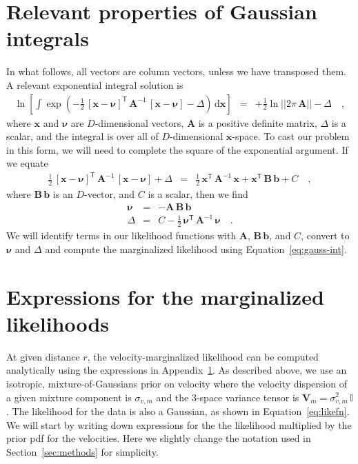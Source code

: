 \documentclass[manuscript, letterpaper]{aastex6}
\newcommand{\project}[1]{\textsl{#1}}
\newcommand{\acronym}[1]{{\small{#1}}}
\newcommand{\apogee}{\project{\acronym{APOGEE}}}
\newcommand{\sectionname}{Section}
\newcommand{\eqname}{Equation}
\newcommand{\dd}{\mathrm{d}}
\newcommand{\transp}[1]{{#1}^{\!\mathsf{T}}}
\newcommand{\inv}[1]{{#1}^{-1}}
\newcommand{\bs}[1]{\boldsymbol{#1}}
\newcommand{\mat}[1]{\mathbf{#1}}
\renewcommand{\vec}[1]{\bs{#1}}
\newcommand{\eye}{\mathbb{I}}
\begin{document}




\appendix

\section{Relevant properties of Gaussian integrals}
\label{sec:appendixA}

In what follows, all vectors are column vectors, unless we have transposed them.
A relevant exponential integral solution is
\begin{eqnarray}
  \ln\left[\int\exp(-\frac{1}{2}\,
    \transp{[\vec{x}-\vec{\nu}]} \,
    \inv{\mat{A}} \,
    [\vec{x}-\vec{\nu}] - \Delta) \, \dd \vec{x}\right]
  &=& +\frac{1}{2}\ln ||2\pi\,\mat{A}|| -\Delta
  \quad , \label{eq:gauss-int}
\end{eqnarray}
where $\vec{x}$ and $\vec{\nu}$ are $D$-dimensional vectors, $\mat{A}$ is a
positive definite matrix, $\Delta$ is a scalar, and the integral is over all of
$D$-dimensional $\vec{x}$-space.
To cast our problem in this form, we will need to complete the square of the
exponential argument.
If we equate
\begin{eqnarray}
  \frac{1}{2}\,\transp{[\vec{x}-\vec{\nu}]}\,\inv{\mat{A}}\,[\vec{x}-\vec{\nu}] + \Delta
  &=& \frac{1}{2}\,\transp{\vec{x}}\,\inv{\mat{A}}\,\vec{x} + \transp{\vec{x}}\,\mat{B}\,\vec{b} + C
  \quad ,
\end{eqnarray}
where $\mat{B}\,\vec{b}$ is an $D$-vector, and $C$ is a scalar, then we find
\begin{eqnarray}
  \vec{\nu} &=& -\mat{A}\,\mat{B}\,\vec{b}
  \\
  \Delta & = & C - \frac{1}{2}\,\transp{\vec{\nu}}\,\inv{\mat{A}}\,\vec{\nu}
  \quad .
\end{eqnarray}
We will identify terms in our likelihood functions with $\mat{A}$,
$\mat{B}\,\vec{b}$, and $C$, convert to $\vec{\nu}$ and $\Delta$ and compute
the marginalized likelihood using \eqname~\ref{eq:gauss-int}.

\section{Expressions for the marginalized likelihoods}\label{sec:appendix}

At given distance $r$, the velocity-marginalized likelihood can be computed
analytically using the expressions in Appendix~\ref{sec:appendixA}.
As described above, we use an isotropic, mixture-of-Gaussians prior on velocity
where the velocity dispersion of a given mixture component is $\sigma_{v,m}$ and
the 3-space variance tensor is $\mat{V}_m = \sigma_{v,m}^2 \, \eye$.
The likelihood for the data is also a Gaussian, as shown in
\eqname~\ref{eq:likefn}.
We will start by writing down expressions for the the likelihood multiplied by
the prior pdf for the velocities.
Here we slightly change the notation used in \sectionname~\ref{sec:methods} for
simplicity.
\end{document}

